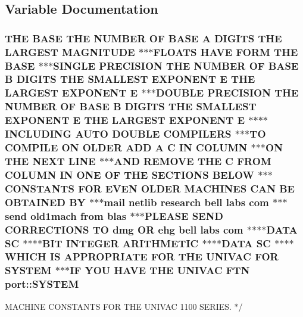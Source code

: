 \subsection{Variable Documentation}
\hypertarget{namespaceport_afa2500030514bcf24109353ab42bf64f}{
\subsubsection[{S\+Y\+S\+T\+E\+M}]{\setlength{\rightskip}{0pt plus 5cm}T\+H\+E B\+A\+S\+E T\+H\+E N\+U\+M\+B\+E\+R O\+F B\+A\+S\+E A D\+I\+G\+I\+T\+S T\+H\+E L\+A\+R\+G\+E\+S\+T M\+A\+G\+N\+I\+T\+U\+D\+E $\ast$$\ast$$\ast$F\+L\+O\+A\+T\+S H\+A\+V\+E F\+O\+R\+M T\+H\+E B\+A\+S\+E $\ast$$\ast$$\ast$S\+I\+N\+G\+L\+E P\+R\+E\+C\+I\+S\+I\+O\+N T\+H\+E N\+U\+M\+B\+E\+R O\+F B\+A\+S\+E B D\+I\+G\+I\+T\+S T\+H\+E S\+M\+A\+L\+L\+E\+S\+T E\+X\+P\+O\+N\+E\+N\+T E T\+H\+E L\+A\+R\+G\+E\+S\+T E\+X\+P\+O\+N\+E\+N\+T E $\ast$$\ast$$\ast$D\+O\+U\+B\+L\+E P\+R\+E\+C\+I\+S\+I\+O\+N T\+H\+E N\+U\+M\+B\+E\+R O\+F B\+A\+S\+E B D\+I\+G\+I\+T\+S T\+H\+E S\+M\+A\+L\+L\+E\+S\+T E\+X\+P\+O\+N\+E\+N\+T E T\+H\+E L\+A\+R\+G\+E\+S\+T E\+X\+P\+O\+N\+E\+N\+T E $\ast$$\ast$$\ast$$\ast$I\+N\+C\+L\+U\+D\+I\+N\+G A\+U\+T\+O D\+O\+U\+B\+L\+E C\+O\+M\+P\+I\+L\+E\+R\+S $\ast$$\ast$$\ast$T\+O C\+O\+M\+P\+I\+L\+E O\+N O\+L\+D\+E\+R A\+D\+D A C I\+N C\+O\+L\+U\+M\+N $\ast$$\ast$$\ast$O\+N T\+H\+E N\+E\+X\+T L\+I\+N\+E $\ast$$\ast$$\ast$A\+N\+D R\+E\+M\+O\+V\+E T\+H\+E C F\+R\+O\+M C\+O\+L\+U\+M\+N I\+N O\+N\+E O\+F T\+H\+E S\+E\+C\+T\+I\+O\+N\+S B\+E\+L\+O\+W $\ast$$\ast$$\ast$C\+O\+N\+S\+T\+A\+N\+T\+S F\+O\+R E\+V\+E\+N O\+L\+D\+E\+R M\+A\+C\+H\+I\+N\+E\+S C\+A\+N B\+E O\+B\+T\+A\+I\+N\+E\+D B\+Y $\ast$$\ast$$\ast$mail netlib research bell labs com $\ast$$\ast$$\ast$send old1mach from blas $\ast$$\ast$$\ast$P\+L\+E\+A\+S\+E S\+E\+N\+D C\+O\+R\+R\+E\+C\+T\+I\+O\+N\+S T\+O dmg O\+R ehg bell labs com $\ast$$\ast$$\ast$$\ast$D\+A\+T\+A S\+C $\ast$$\ast$$\ast$$\ast$B\+I\+T I\+N\+T\+E\+G\+E\+R A\+R\+I\+T\+H\+M\+E\+T\+I\+C $\ast$$\ast$$\ast$$\ast$D\+A\+T\+A S\+C $\ast$$\ast$$\ast$$\ast$W\+H\+I\+C\+H I\+S A\+P\+P\+R\+O\+P\+R\+I\+A\+T\+E F\+O\+R T\+H\+E U\+N\+I\+V\+A\+C F\+O\+R S\+Y\+S\+T\+E\+M $\ast$$\ast$$\ast$I\+F Y\+O\+U H\+A\+V\+E T\+H\+E U\+N\+I\+V\+A\+C F\+T\+N port\+::\+S\+Y\+S\+T\+E\+M}}\label{namespaceport_afa2500030514bcf24109353ab42bf64f}

\begin{DoxyItemize}
\item M\+A\+C\+H\+I\+N\+E C\+O\+N\+S\+T\+A\+N\+T\+S F\+O\+R T\+H\+E U\+N\+I\+V\+A\+C 1100 S\+E\+R\+I\+E\+S. $\ast$/ 
\end{DoxyItemize}